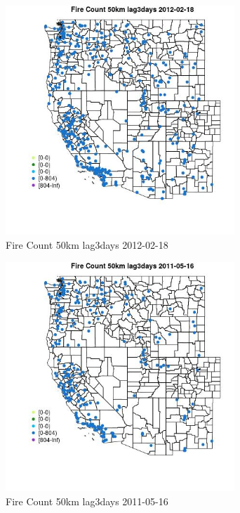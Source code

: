 \begin{figure} 
\centering  
\includegraphics[width=0.77\textwidth]{Code_Outputs/Report_ML_input_PM25_Step4_part_f_de_duplicated_aves_prioritize_24hr_obswNAs_MapObsFire_Count_50km_lag3days2012-02-18.jpg} 
\caption{\label{fig:Report_ML_input_PM25_Step4_part_f_de_duplicated_aves_prioritize_24hr_obswNAsMapObsFire_Count_50km_lag3days2012-02-18}Fire Count 50km lag3days 2012-02-18} 
\end{figure} 
 

\begin{figure} 
\centering  
\includegraphics[width=0.77\textwidth]{Code_Outputs/Report_ML_input_PM25_Step4_part_f_de_duplicated_aves_prioritize_24hr_obswNAs_MapObsFire_Count_50km_lag3days2011-05-16.jpg} 
\caption{\label{fig:Report_ML_input_PM25_Step4_part_f_de_duplicated_aves_prioritize_24hr_obswNAsMapObsFire_Count_50km_lag3days2011-05-16}Fire Count 50km lag3days 2011-05-16} 
\end{figure} 
 

